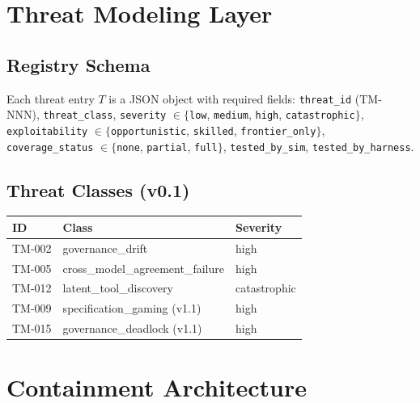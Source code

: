 \documentclass[11pt]{article}
\begin{document}

\section{Threat Modeling Layer}

\subsection{Registry Schema}

Each threat entry $T$ is a JSON object with required fields:
\texttt{threat\_id} (TM-NNN), \texttt{threat\_class}, \texttt{severity}
$\in \{$\texttt{low}, \texttt{medium}, \texttt{high}, \texttt{catastrophic}$\}$,
\texttt{exploitability} $\in \{$\texttt{opportunistic}, \texttt{skilled},
\texttt{frontier\_only}$\}$, \texttt{coverage\_status} $\in \{$\texttt{none},
\texttt{partial}, \texttt{full}$\}$, \texttt{tested\_by\_sim}, \texttt{tested\_by\_harness}.

\subsection{Threat Classes (v0.1)}

\begin{table}[h]
\centering
\begin{tabular}{lll}
\toprule
ID & Class & Severity \\
\midrule
TM-002 & governance\_drift & high \\
TM-005 & cross\_model\_agreement\_failure & high \\
TM-012 & latent\_tool\_discovery & catastrophic \\
TM-009 & specification\_gaming (v1.1) & high \\
TM-015 & governance\_deadlock (v1.1) & high \\
\bottomrule
\end{tabular}
\end{table}


\section{Containment Architecture}
\end{document}
